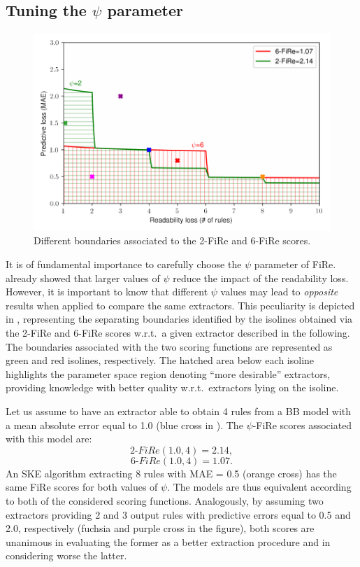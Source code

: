 \documentclass{article}
\newcommand{\fire}{FiRe}
\newcommand{\psifire}{$\psi$-\fire}
\begin{document}
\subsection{Tuning the $\psi$ parameter}\label{ssec:psi}

\begin{figure}
	\centering
	\includegraphics[width=\linewidth]{figures/areas.pdf}
	\caption{Different boundaries associated to the 2-\fire{} and 6-\fire{} scores.}\label{fig:areas}
\end{figure}

It is of fundamental importance to carefully choose the $\psi$ parameter of \fire{}.
%
 already showed that larger values of $\psi$ reduce the impact of the readability loss.
%
However, it is important to know that different $\psi$ values may lead to \emph{opposite} results when applied to compare the same extractors.
%
This peculiarity is depicted in , representing the separating boundaries identified by the isolines obtained via the 2-\fire{} and 6-\fire{} scores w.r.t.\ a given extractor described in the following.
%
The boundaries associated with the two scoring functions are represented as green and red isolines, respectively.
%
The hatched area below each isoline highlights the parameter space region denoting ``more desirable'' extractors, providing knowledge with better quality w.r.t.\ extractors lying on the isoline.

Let us assume to have an extractor able to obtain 4 rules from a BB model with a mean absolute error equal to 1.0 (blue cross in ).
%
The \psifire{} scores associated with this model are:
%
\begin{equation*}
	2\textrm{-}\fire(1.0, 4)=2.14,
\end{equation*}
%
\begin{equation*}
	6\textrm{-}\fire(1.0, 4)=1.07.
\end{equation*}
%
An SKE algorithm extracting 8 rules with MAE = 0.5 (orange cross) has the same \fire{} scores for both values of $\psi$.
%
The models are thus equivalent according to both of the considered scoring functions.
%
Analogously, by assuming two extractors providing 2 and 3 output rules with predictive errors equal to 0.5 and 2.0, respectively (fuchsia and purple cross in the figure), both scores are unanimous in evaluating the former as a better extraction procedure and in considering worse the latter.
\end{document}
